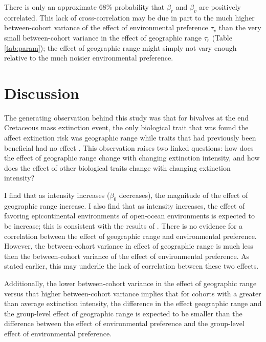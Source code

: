 \documentclass{article}
\begin{document}
There is only an approximate 68\% probability that \(\beta_{r}\) and \(\beta_{v}\) are positively correlated. This lack of cross-correlation may be due in part to the much higher between-cohort variance of the effect of environmental preference \(\tau_{v}\) than the very small between-cohort variance in the effect of geographic range \(\tau_{r}\) (Table \ref{tab:param}); the effect of geographic range might simply not vary enough relative to the much noisier environmental preference. 


\section{Discussion}

The generating observation behind this study was that for bivalves at the end Cretaceous mass extinction event, the only biological trait that was found the affect extinction risk was geographic range while traits that had previously been beneficial had no effect \citep{Jablonski1986}. This observation raises two linked questions: how does the effect of geographic range change with changing extinction intensity, and how does the effect of other biological traits change with changing extinction intensity?

I find that as intensity increases (\(\beta_{0}\) decreases), the magnitude of the effect of geographic range increase. I also find that as intensity increases, the effect of favoring epicontinental environments of open-ocean environments is expected to be increase; this is consistent with the results of \citet{Miller2009a}. There is no evidence for a correlation between the effect of geographic range and environmental preference. However, the between-cohort variance in effect of geographic range is much less then the between-cohort variance of the effect of environmental preference. As stated earlier, this may underlie the lack of correlation between these two effects.

Additionally, the lower between-cohort variance in the effect of geographic range versus that higher between-cohort variance implies that for cohorts with a greater than average extinction intensity, the difference in the effect geographic range and the group-level effect of geographic range is expected to be smaller than the difference between the effect of environmental preference and the group-level effect of environmental preference.
\end{document}
